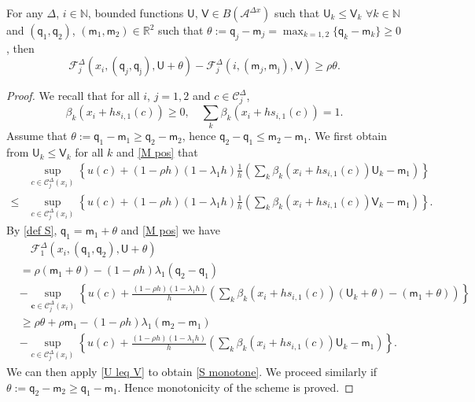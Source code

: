\documentclass[10pt,a4paper]{amsart}
\def\bm{{\mathsf{m}}}
\def\bq{{\mathsf{q}}}
\def\sU{{\mathsf{U}}}
\def\sV{{\mathsf{V}}}
\newcommand{\Dx}{{\Delta x}}
\newcommand{\D}{\Delta}
\newcommand{\N}{\mathbb{N}}
\newcommand{\R}{\mathbb{R}}
\newcommand{\bc}{\mathbf{c}}
\newcommand{\beq}{\begin{equation}}
\newcommand{\eeq}{\end{equation}}
\newcommand{\mA}{\mathcal A}
\newcommand{\mC}{\mathcal C}
\begin{document}
\begin{lemma}\label{monotone_scheme}
For any  $\D$, $i\in\N$,
	bounded functions $\sU$, $\sV\in B(\mA^\Dx)$ such that $\sU_k\le \sV_k$  $\forall k\in\N$ and  $(\bq_1,\bq_2)$, $(\bm_1,\bm_2)\in\R^2$ such that $\displaystyle \theta:=\bq_j-\bm_j=\max_{k=1,2}\{\bq_k-\bm_k\}\ge 0$, then
\begin{equation}\label{S monotone}
\mathcal{F}^\D_j(x_i,(\bq_j,\bq_{\bar \jmath}), \mathsf{U}+\theta)-\mathcal{F}^\D_j(i,(\bm_j,\bm_{\bar \jmath}),\mathsf{V})\ge \rho\theta.
\end{equation}
\end{lemma}

\begin{proof}
We recall that for all $i$, $j=1,2$ and $c \in \mC^{\D}_{j}$,
\beq\label{M pos}
\beta_k(x_i+hs_{i,1}(c))\ge 0, \quad \sum_k \beta_k(x_i+hs_{i,1}(c))=1.
\eeq
Assume that $\theta:=\bq_1-\bm_1\ge \bq_2-\bm_2$, hence $\bq_2-\bq_1\le \bm_2-\bm_1$. We first obtain from $\sU_k\le \sV_k$ for all $k$ and \cref{M pos} that
\beq\label{U leq V}
\begin{aligned}
&\sup_{c\in \mC^{\D}_{j}(x_i)}\left\{
	u(c)+(1-\rho h)(1-\lambda_1h)\frac{1}{h}\left(\sum_k \beta_k(x_i+hs_{i,1}(c))\sU_k-\bm_1\right)\right\}\\
\leq {}&
\sup_{c\in \mC^{\D}_{j}(x_i)}\left\{
	u(c)+(1-\rho h)(1-\lambda_1h)\frac{1}{h}\left(\sum_k \beta_k(x_i+hs_{i,1}(c))\sV_k-\bm_1\right)\right\}.
\end{aligned}
\eeq
By \cref{def S}, $\bq_1=\bm_1+\theta$ and \cref{M pos} we have
\begin{align*}
&\quad \mathcal{F}^\D_1(x_i,(\bq_1,\bq_2), \sU+\theta)\\
&=\rho(\bm_1+\theta)-(1-\rho h)\lambda_1(\bq_2-\bq_1)\\
       &-\sup_{\bc\in \mC^{\D}_{j}(x_i)}\left\{
	u(c)+\frac{(1-\rho h)(1-\lambda_1h)}{h}\left(\sum_k \beta_k(x_i+hs_{i,1}(c))(\sU_k+\theta)-(\bm_1+\theta)  \right)\right\}\\
	&\geq \rho \theta+\rho \bm_1-(1-\rho h)\lambda_1(\bm_2-\bm_1)\\
       &-\sup_{c\in \mC^{\D}_{j}(x_i)}\left\{
	u(c)+\frac{(1-\rho h)(1-\lambda_1h)}{h}\left(\sum_k \beta_k(x_i+hs_{i,1}(c))\sU_k-\bm_1\right)\right\}.
\end{align*}
We can then apply \cref{U leq V} to obtain \cref{S monotone}. We proceed similarly if $\theta:=\bq_2-\bm_2\ge \bq_1-\bm_1$. Hence monotonicity of the scheme is proved.\par
 \end{proof}
\end{document}
